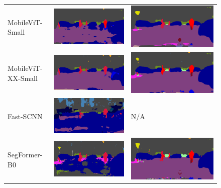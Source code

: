 \documentclass[a4paper,12pt]{report}
\begin{document}
\begin{figure}[]
\begin{tabular}{lll}
        MobileViT-Small    & \includegraphics[width=.2\linewidth,valign=m]{res/lightweight-uda-baseline-qualitative/mobilevit-small-sourceonly.png}    & \includegraphics[width=.2\linewidth,valign=m]{res/lightweight-uda-baseline-qualitative/mobilevit-small-selftraining.png}    \\
        MobileViT-XX-Small & \includegraphics[width=.2\linewidth,valign=m]{res/lightweight-uda-baseline-qualitative/mobilevit-xx-small-sourceonly.png} & \includegraphics[width=.2\linewidth,valign=m]{res/lightweight-uda-baseline-qualitative/mobilevit-xx-small-selftraining.png} \\
        Fast-SCNN          & \includegraphics[width=.2\linewidth,valign=m]{res/lightweight-uda-baseline-qualitative/fast-scnn-sourceonly.png}          & N/A                                                                                                                         \\
        SegFormer-B0       & \includegraphics[width=.2\linewidth,valign=m]{res/lightweight-uda-baseline-qualitative/segformer-mitb0-sourceonly.png}    & \includegraphics[width=.2\linewidth,valign=m]{res/lightweight-uda-baseline-qualitative/segformer-mitb0-selftraining.png}    \\

\end{tabular}
\end{figure}
\end{document}
